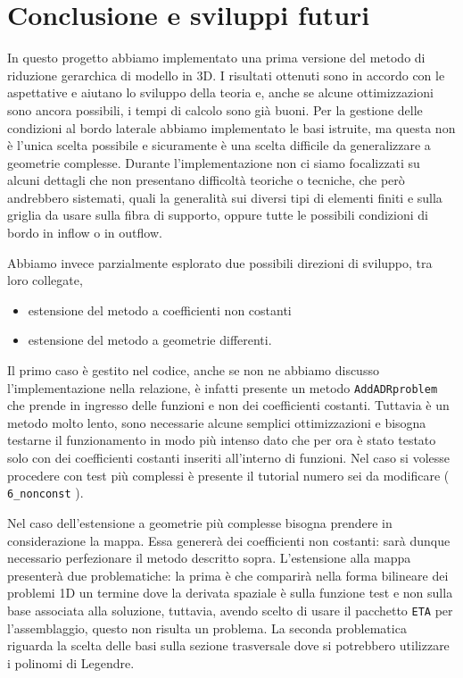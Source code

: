 \chapter{Conclusione e sviluppi futuri}
In questo progetto abbiamo implementato una prima versione del metodo di riduzione gerarchica di modello in 3D.
I risultati ottenuti sono in accordo con le aspettative e aiutano lo sviluppo della teoria e, anche se alcune ottimizzazioni sono ancora possibili, 
i tempi di calcolo sono gi\`a buoni.
Per la gestione delle condizioni al bordo laterale abbiamo implementato le basi istruite, ma questa non \`e l'unica
scelta possibile e sicuramente \`e una scelta difficile da generalizzare a geometrie complesse.
Durante l'implementazione non ci siamo focalizzati su alcuni dettagli che non presentano difficolt\`a teoriche o tecniche,
che per\`o andrebbero sistemati, quali la generalit\`a sui diversi tipi di elementi finiti e sulla griglia da usare sulla fibra di supporto,
oppure tutte le possibili condizioni di bordo in inflow o in outflow.

Abbiamo invece parzialmente esplorato due possibili direzioni di sviluppo, tra loro collegate,
\begin{itemize}
 \item estensione del metodo a coefficienti non costanti
 \item estensione del metodo a geometrie differenti.
\end{itemize}
Il primo caso \`e gestito nel codice, anche se non ne abbiamo discusso l'implementazione nella
relazione, \`e infatti presente un metodo \texttt{AddADRproblem} che prende in ingresso delle funzioni e non dei coefficienti costanti.
Tuttavia \`e un metodo molto lento, sono necessarie alcune semplici ottimizzazioni e bisogna testarne il funzionamento
in modo pi\`u intenso dato che per ora \`e stato testato solo con dei coefficienti costanti inseriti all'interno di funzioni.
Nel caso si volesse procedere con test pi\`u complessi \`e presente il tutorial numero sei da modificare ( \texttt{6\_nonconst} ).
 
Nel caso dell'estensione a geometrie pi\`u complesse bisogna prendere in considerazione la
mappa. Essa generer\`a dei coefficienti non costanti: sar\`a dunque necessario perfezionare il metodo descritto
sopra. L'estensione alla mappa presenter\`a due problematiche: la prima \`e che comparir\`a nella forma bilineare dei problemi
1D un termine dove la derivata spaziale \`e sulla funzione test e non sulla base associata alla soluzione, tuttavia, 
avendo scelto di usare il pacchetto \texttt{ETA} per l'assemblaggio, questo non risulta un problema.
La seconda problematica riguarda la scelta delle basi sulla sezione trasversale dove si potrebbero utilizzare i polinomi di Legendre.


